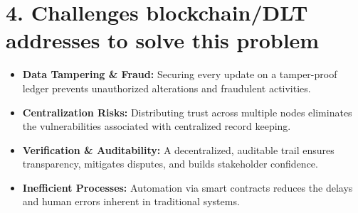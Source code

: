 \documentclass[12pt]{article}
\begin{document}
\section*{4. Challenges blockchain/DLT addresses to solve this problem}
\begin{itemize}[leftmargin=*]
    \item \textbf{Data Tampering \& Fraud:} Securing every update on a tamper-proof ledger prevents unauthorized alterations and fraudulent activities.
    \item \textbf{Centralization Risks:} Distributing trust across multiple nodes eliminates the vulnerabilities associated with centralized record keeping.
    \item \textbf{Verification \& Auditability:} A decentralized, auditable trail ensures transparency, mitigates disputes, and builds stakeholder confidence.
    \item \textbf{Inefficient Processes:} Automation via smart contracts reduces the delays and human errors inherent in traditional systems.
\end{itemize}
\end{document}
